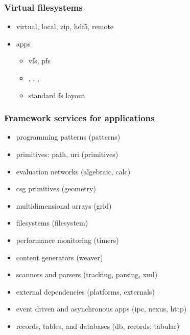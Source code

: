 \begin{frame}
%
  \label{frame:persistence-virtual-filesystems}
%
  \frametitle{Virtual filesystems}
%
  \begin{itemize}
%
  \item virtual, local, zip, hdf5, remote
%
  \item apps
    \begin{itemize}
    \item vfs, pfs
    \item {}, , ,
    \item standard fs layout
    \end{itemize}
%
  \end{itemize}
%
\end{frame}

\begin{frame}
%
  \frametitle{Framework services for applications}
%
  \begin{itemize}
  \item programming patterns (patterns)
  \item primitives: path, uri (primitives)
  \item evaluation networks (algebraic, calc)
  \item csg primitives (geometry)
  \item multidimensional arrays (grid)
  \item filesystems (filesystem)
  \item performance monitoring (timers)
  \item content generators (weaver)
  \item scanners and parsers (tracking, parsing, xml)
  \item external dependencies (platforms, externals)
  \item event driven and asynchronous apps (ipc, nexus, http)
  \item records, tables, and databases (db, records, tabular)
  \end{itemize}
%
\end{frame}


